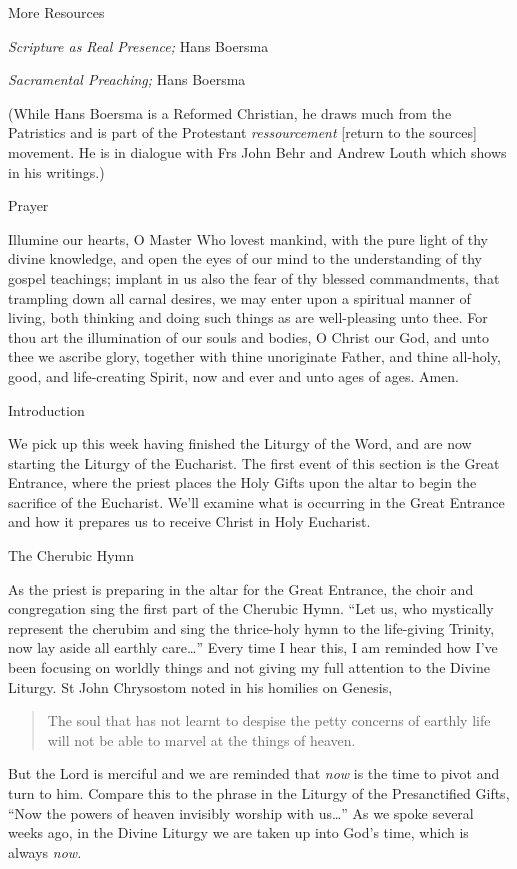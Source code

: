 \documentclass[
]{article}
\begin{document}
More Resources

\emph{Scripture as Real Presence;} Hans Boersma

\emph{Sacramental Preaching;} Hans Boersma

(While Hans Boersma is a Reformed Christian, he draws much from the
Patristics and is part of the Protestant \emph{ressourcement} {[}return
to the sources{]} movement. He is in dialogue with Frs John Behr and
Andrew Louth which shows in his writings.)

Prayer

Illumine our hearts, O Master Who lovest mankind, with the pure light of
thy divine knowledge, and open the eyes of our mind to the understanding
of thy gospel teachings; implant in us also the fear of thy blessed
commandments, that trampling down all carnal desires, we may enter upon
a spiritual manner of living, both thinking and doing such things as are
well-pleasing unto thee. For thou art the illumination of our souls and
bodies, O Christ our God, and unto thee we ascribe glory, together with
thine unoriginate Father, and thine all-holy, good, and life-creating
Spirit, now and ever and unto ages of ages. Amen.

Introduction

We pick up this week having finished the Liturgy of the Word, and are
now starting the Liturgy of the Eucharist. The first event of this
section is the Great Entrance, where the priest places the Holy Gifts
upon the altar to begin the sacrifice of the Eucharist. We'll examine
what is occurring in the Great Entrance and how it prepares us to
receive Christ in Holy Eucharist.

The Cherubic Hymn

As the priest is preparing in the altar for the Great Entrance, the
choir and congregation sing the first part of the Cherubic Hymn. ``Let
us, who mystically represent the cherubim and sing the thrice-holy hymn
to the life-giving Trinity, now lay aside all earthly care\ldots{}''
Every time I hear this, I am reminded how I've been focusing on worldly
things and not giving my full attention to the Divine Liturgy. St John
Chrysostom noted in his homilies on Genesis,

\begin{quote}
The soul that has not learnt to despise the petty concerns of earthly
life will not be able to marvel at the things of heaven.
\end{quote}

But the Lord is merciful and we are reminded that \emph{now} is the time
to pivot and turn to him. Compare this to the phrase in the Liturgy of
the Presanctified Gifts, ``Now the powers of heaven invisibly worship
with us\ldots{}'' As we spoke several weeks ago, in the Divine Liturgy
we are taken up into God's time, which is always \emph{now.}
\end{document}
